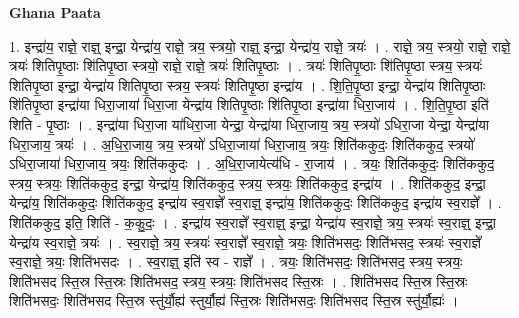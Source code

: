\documentclass[17pt]{extarticle}
\begin{document}
\textbf{Ghana Paata } \newline

1. इन्द्रा॑य॒ राज्ञे॒ राज्ञ्॒ इन्द्रा॒ येन्द्रा॑य॒ राज्ञे॒ त्रय॒ स्त्रयो॒ राज्ञ्॒ इन्द्रा॒ येन्द्रा॑य॒ राज्ञे॒ त्रयः॑ । . राज्ञे॒ त्रय॒ स्त्रयो॒ राज्ञे॒ राज्ञे॒ त्रयः॑ शितिपृ॒ष्ठाः शि॑तिपृ॒ष्ठा स्त्रयो॒ राज्ञे॒ राज्ञे॒ त्रयः॑ शितिपृ॒ष्ठाः । . त्रयः॑ शितिपृ॒ष्ठाः शि॑तिपृ॒ष्ठा स्त्रय॒ स्त्रयः॑ शितिपृ॒ष्ठा इन्द्रा॒ येन्द्रा॑य शितिपृ॒ष्ठा स्त्रय॒ स्त्रयः॑ शितिपृ॒ष्ठा इन्द्रा॑य । . शि॒ति॒पृ॒ष्ठा इन्द्रा॒ येन्द्रा॑य शितिपृ॒ष्ठाः शि॑तिपृ॒ष्ठा इन्द्रा॑या धिरा॒जाया॑ धिरा॒जा येन्द्रा॑य शितिपृ॒ष्ठाः शि॑तिपृ॒ष्ठा इन्द्रा॑या धिरा॒जाय॑ । . शि॒ति॒पृ॒ष्ठा इति॑ शिति - पृ॒ष्ठाः । . इन्द्रा॑या धिरा॒जा या॑धिरा॒जा येन्द्रा॒ येन्द्रा॑या धिरा॒जाय॒ त्रय॒ स्त्रयो॑ ऽधिरा॒जा येन्द्रा॒ येन्द्रा॑या धिरा॒जाय॒ त्रयः॑ । . अ॒धि॒रा॒जाय॒ त्रय॒ स्त्रयो॑ ऽधिरा॒जाया॑ धिरा॒जाय॒ त्रयः॒ शिति॑ककुदः॒ शिति॑ककुद॒ स्त्रयो॑ ऽधिरा॒जाया॑ धिरा॒जाय॒ त्रयः॒ शिति॑ककुदः । . अ॒धि॒रा॒जायेत्य॑धि - रा॒जाय॑ । . त्रयः॒ शिति॑ककुदः॒ शिति॑ककुद॒ स्त्रय॒ स्त्रयः॒ शिति॑ककुद॒ इन्द्रा॒ येन्द्रा॑य॒ शिति॑ककुद॒ स्त्रय॒ स्त्रयः॒ शिति॑ककुद॒ इन्द्रा॑य । . शिति॑ककुद॒ इन्द्रा॒ येन्द्रा॑य॒ शिति॑ककुदः॒ शिति॑ककुद॒ इन्द्रा॑य स्व॒राज्ञे᳚ स्व॒राज्ञ्॒ इन्द्रा॑य॒ शिति॑ककुदः॒ शिति॑ककुद॒ इन्द्रा॑य स्व॒राज्ञे᳚ । . शिति॑ककुद॒ इति॒ शिति॑ - क॒कु॒दः॒ । . इन्द्रा॑य स्व॒राज्ञे᳚ स्व॒राज्ञ्॒ इन्द्रा॒ येन्द्रा॑य स्व॒राज्ञे॒ त्रय॒ स्त्रयः॑ स्व॒राज्ञ्॒ इन्द्रा॒ येन्द्रा॑य स्व॒राज्ञे॒ त्रयः॑ । . स्व॒राज्ञे॒ त्रय॒ स्त्रयः॑ स्व॒राज्ञे᳚ स्व॒राज्ञे॒ त्रयः॒ शिति॑भसदः॒ शिति॑भसद॒ स्त्रयः॑ स्व॒राज्ञे᳚ स्व॒राज्ञे॒ त्रयः॒ शिति॑भसदः । . स्व॒राज्ञ्॒ इति॑ स्व - राज्ञे᳚ । . त्रयः॒ शिति॑भसदः॒ शिति॑भसद॒ स्त्रय॒ स्त्रयः॒ शिति॑भसद स्ति॒स्र स्ति॒स्रः शिति॑भसद॒ स्त्रय॒ स्त्रयः॒ शिति॑भसद स्ति॒स्रः । . शिति॑भसद स्ति॒स्र स्ति॒स्रः शिति॑भसदः॒ शिति॑भसद स्ति॒स्र स्तु॑र्यौ॒ह्य॑ स्तुर्यौ॒ह्य॑ स्ति॒स्रः शिति॑भसदः॒ शिति॑भसद स्ति॒स्र स्तु॑र्यौ॒ह्यः॑ । \newline
\end{document}

